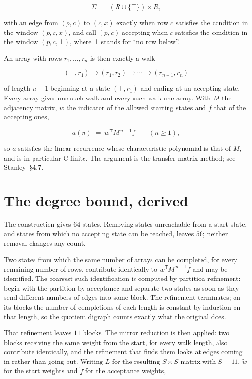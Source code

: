 \documentclass[11pt]{article}
\theoremstyle{definition}
\begin{document}
\[\Sigma \;=\; (R \cup \{\top\}) \times R,\]

with an edge from $(p,c)$ to $(c,x)$ exactly when row $c$ satisfies the condition in the window $(p,c,x)$, and call $(p,c)$ accepting when $c$ satisfies the condition in the window $(p,c,\bot)$, where $\bot$ stands for ``no row below''.

An array with rows $r_1,\dots,r_n$ is then exactly a walk

\[(\top,r_1) \to (r_1,r_2) \to \cdots \to (r_{n-1},r_n)\]

of length $n-1$ beginning at a state $(\top,r_1)$ and ending at an accepting state. Every array gives one such walk and every such walk one array. With $M$ the adjacency matrix, $w$ the indicator of the allowed starting states and $f$ that of the accepting ones,

\[a(n) \;=\; w^{\mathsf T} M^{\,n-1} f \qquad (n \ge 1),\]

so $a$ satisfies the linear recurrence whose characteristic polynomial is that of $M$, and is in particular C-finite. The argument is the transfer-matrix method; see Stanley~\S4.7.

\section{The degree bound, derived}

The construction gives $64$ states. Removing states unreachable from a start state, and states from which no accepting state can be reached, leaves $56$; neither removal changes any count.

Two states from which the same number of arrays can be completed, for every remaining number of rows, contribute identically to $w^{\mathsf T}M^{\,n-1}f$ and may be identified. The coarsest such identification is computed by partition refinement: begin with the partition by acceptance and separate two states as soon as they send different numbers of edges into some block. The refinement terminates; on its blocks the number of completions of each length is constant by induction on that length, so the quotient digraph counts exactly what the original does.

That refinement leaves $11$ blocks. The mirror reduction is then applied: two blocks receiving the same weight from the start, for every walk length, also contribute identically, and the refinement that finds them looks at edges coming in rather than going out. Writing $L$ for the resulting $S \times S$ matrix with $S = 11$, $\tilde w$ for the start weights and $\tilde f$ for the acceptance weights,
\end{document}
